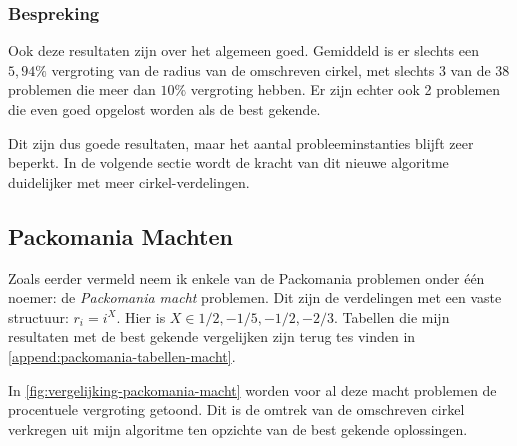 \documentclass[12pt,a4paper,oneside]{book}
\begin{document}
\subsubsection{Bespreking}

Ook deze resultaten zijn over het algemeen goed.
Gemiddeld is er slechts een $5,94\%$ vergroting van de radius van de omschreven cirkel, met slechts 3 van de 38 problemen die meer dan $10\%$ vergroting hebben.
Er zijn echter ook 2 problemen die even goed opgelost worden als de best gekende.

Dit zijn dus goede resultaten, maar het aantal probleeminstanties blijft zeer beperkt.
In de volgende sectie wordt de kracht van dit nieuwe algoritme duidelijker met meer cirkel-verdelingen.

\subsection{Packomania Machten} \label{sec:vergelijking-packomania-machten}

Zoals eerder vermeld neem ik enkele van de Packomania problemen onder één noemer: de \textit{Packomania macht} problemen.
Dit zijn de verdelingen met een vaste structuur: $r_i=i^X$.
Hier is $X \in {1/2, -1/5, -1/2, -2/3}$.
Tabellen die mijn resultaten met de best gekende vergelijken zijn terug tes vinden in \autoref{append:packomania-tabellen-macht}.

In \autoref{fig:vergelijking-packomania-macht} worden voor al deze macht problemen de procentuele vergroting getoond.
Dit is de omtrek van de omschreven cirkel verkregen uit mijn algoritme ten opzichte van de best gekende oplossingen.
\end{document}
